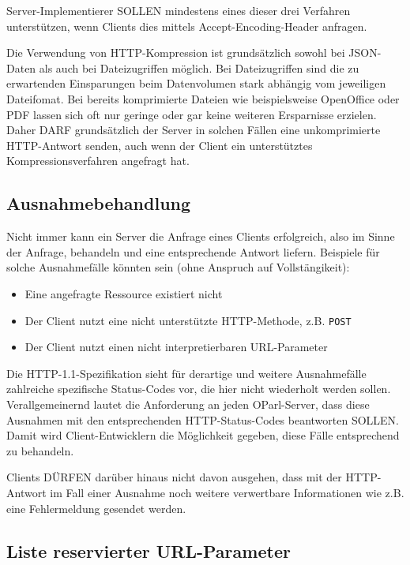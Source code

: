 \documentclass[,a4paper]{article}
\begin{document}
Server-Implementierer SOLLEN mindestens eines dieser drei Verfahren
unterstützen, wenn Clients dies mittels Accept-Encoding-Header anfragen.

Die Verwendung von HTTP-Kompression ist grundsätzlich sowohl bei
JSON-Daten als auch bei Dateizugriffen möglich. Bei Dateizugriffen sind
die zu erwartenden Einsparungen beim Datenvolumen stark abhängig vom
jeweiligen Dateifomat. Bei bereits komprimierte Dateien wie
beispielsweise OpenOffice oder PDF lassen sich oft nur geringe oder gar
keine weiteren Ersparnisse erzielen. Daher DARF grundsätzlich der Server
in solchen Fällen eine unkomprimierte HTTP-Antwort senden, auch wenn der
Client ein unterstütztes Kompressionsverfahren angefragt hat.

\subsection{Ausnahmebehandlung}\label{ausnahmebehandlung}

Nicht immer kann ein Server die Anfrage eines Clients erfolgreich, also
im Sinne der Anfrage, behandeln und eine entsprechende Antwort liefern.
Beispiele für solche Ausnahmefälle könnten sein (ohne Anspruch auf
Vollstängikeit):

\begin{itemize}
\item
  Eine angefragte Ressource existiert nicht
\item
  Der Client nutzt eine nicht unterstützte HTTP-Methode, z.B.
  \texttt{POST}
\item
  Der Client nutzt einen nicht interpretierbaren URL-Parameter
\end{itemize}

Die HTTP-1.1-Spezifikation sieht für derartige und weitere Ausnahmefälle
zahlreiche spezifische Status-Codes vor, die hier nicht wiederholt
werden sollen. Verallgemeinernd lautet die Anforderung an jeden
OParl-Server, dass diese Ausnahmen mit den entsprechenden
HTTP-Status-Codes beantworten SOLLEN. Damit wird Client-Entwicklern die
Möglichkeit gegeben, diese Fälle entsprechend zu behandeln.

Clients DÜRFEN darüber hinaus nicht davon ausgehen, dass mit der
HTTP-Antwort im Fall einer Ausnahme noch weitere verwertbare
Informationen wie z.B. eine Fehlermeldung gesendet werden.

\subsection{Liste reservierter
URL-Parameter}\label{liste-reservierter-url-parameter}
\end{document}
